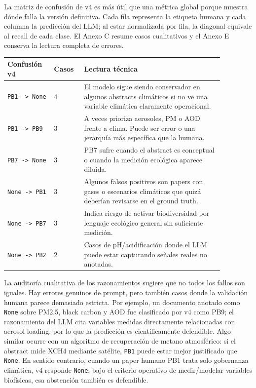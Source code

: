La matriz de confusión de v4 es más útil que una métrica global porque muestra dónde falla la versión definitiva. Cada fila representa la etiqueta humana y cada columna la predicción del LLM; al estar normalizada por fila, la diagonal equivale al recall de cada clase. El Anexo C resume casos cualitativos y el Anexo E conserva la lectura completa de errores.


\begin{center}
\scriptsize
\setlength{\tabcolsep}{4pt}
\renewcommand{\arraystretch}{1.15}
\begin{tabular}{p{0.17\linewidth}p{0.12\linewidth}p{0.58\linewidth}}
\toprule
Confusión v4 & Casos & Lectura técnica \\
\midrule
\texttt{PB1 -> None} & 4 & El modelo sigue siendo conservador en algunos abstracts climáticos si no ve una variable climática claramente operacional. \\
\texttt{PB1 -> PB9} & 3 & A veces prioriza aerosoles, PM o AOD frente a clima. Puede ser error o una jerarquía más específica que la humana. \\
\texttt{PB7 -> None} & 3 & PB7 sufre cuando el abstract es conceptual o cuando la medición ecológica aparece diluida. \\
\texttt{None -> PB1} & 3 & Algunos falsos positivos son papers con gases o escenarios climáticos que quizá deberían revisarse en el ground truth. \\
\texttt{None -> PB7} & 3 & Indica riesgo de activar biodiversidad por lenguaje ecológico general sin suficiente medición. \\
\texttt{None -> PB2} & 2 & Casos de pH/acidificación donde el LLM puede estar capturando señales reales no anotadas. \\
\bottomrule
\end{tabular}
\end{center}

La auditoría cualitativa de los razonamientos sugiere que no todos los fallos son iguales. Hay errores genuinos de prompt, pero también casos donde la validación humana parece demasiado estricta. Por ejemplo, un documento anotado como \texttt{None} sobre PM2.5, black carbon y AOD fue clasificado por v4 como PB9; el razonamiento del LLM cita variables medidas directamente relacionadas con aerosol loading, por lo que la predicción es científicamente defendible. Algo similar ocurre con un algoritmo de recuperación de metano atmosférico: si el abstract mide XCH4 mediante satélite, \texttt{PB1} puede estar mejor justificado que \texttt{None}. En sentido contrario, cuando un paper humano PB1 trata solo gobernanza climática, v4 responde \texttt{None}; bajo el criterio operativo de medir/modelar variables biofísicas, esa abstención también es defendible.

